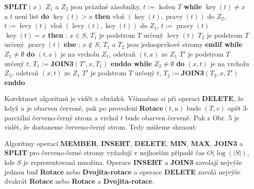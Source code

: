 \documentclass[a4paper,12pt]{article}
\DeclareMathOperator*{\levy}{levy}
\DeclareMathOperator*{\pravy}{pravy}
\DeclareMathOperator*{\key}{key}
\begin{document}
{\bf SPLIT$(x)$\newline 
$Z_1$} a $Z_2$ jsou prázdné zásobníky, $t:=\text{ kořen }T$\newline 
{\bf while} $\key(t)\ne x$ a $t$ není list {\bf do}\newline 
\phantom{---}{\bf if} $\key(t)>x$ {\bf then}\newline 
\phantom{------}vlož $(\key(t),\pravy(t))$ do $Z_2$, $t:=\levy(t)$ \newline 
\phantom{---}{\bf else}\newline 
\phantom{------}vlož $(\levy(t),\key(t))$ do $Z_1$, $t:=\pravy(t)$ \newline 
\phantom{---}{\bf endif\newline 
enddo \newline 
if} $\key(t)=x$ {\bf then}\newline 
\phantom{---}{\bf Výstup}: $x\in S$, $T_1$ je podstrom $T$ určený $\levy(t)$ \newline 
\phantom{---}$T_2$ je podstrom $T$ určený $\pravy(t)$ \newline 
{\bf else}\newline 
\phantom{---}{\bf Výstup}: $x\notin S$, $T_1$ a $T_2$ jsou jednoprvkové stromy\newline 
{\bf endif \newline 
while} $Z_1\ne\emptyset$ {\bf do}\newline 
\phantom{---}$(t,x)$ je na vrcholu $Z_1$, odstraň $(t,x)$ ze $Z_1$ \newline 
\phantom{---}$T'$ je podstrom $T$ určený $t$, $T_1:=${\bf JOIN3$(T',x,T_1
)$ \newline 
enddo\newline 
while} $Z_2\ne\emptyset$ {\bf do}\newline 
\phantom{---}$(x,t)$ je na vrcholu $Z_2$, odstraň $(x,t)$ ze $Z_1$ \newline 
\phantom{---}$T'$ je podstrom $T$ určený $t$, $T_2:=${\bf JOIN3$(T_2,x,T'
)$ \newline 
enddo}

Korektnost algoritmů je vidět z 
obrázků. Všimněme si při ope\-raci {\bf DELETE}, že když $
u$ je 
obarven červeně, pak po provedení {\bf Rotace$(t,u)$} bude $
(T,v)$ opět 
3-parciální červeno-černý strom a vrchol $t$ bude obarven červeně.  
Pak z Obr.  5 je vidět, že dostaneme červeno-černý 
strom. Tedy můžeme shrnout:

Algoritmy operací {\bf MEMBER}, {\bf INSERT}, 
{\bf DE\-LE\-TE}, {\bf MIN}, {\bf MAX}, {\bf JOIN3} a {\bf SPLIT} pro červeno-černé 
stro\-my vyžadují v nejhorším případě čas $O
(\log(|S|)$, kde $S$ je 
reprezentovaná množina.  Operace {\bf INSERT} a {\bf JOIN3} zavolají 
nejvýše jednou buď {\bf Rotace} nebo {\bf Dvojita-rota\-ce} a operace 
{\bf DE\-LE\-TE} zavolá nejvýše dvakrát {\bf Rotace} nebo {\bf Rotace} a 
{\bf Dvojita-ro\-ta\-ce}.  
\endproclaim
\end{document}
